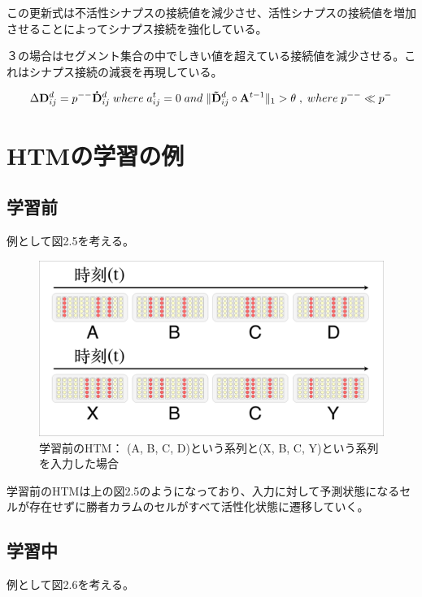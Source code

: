 この更新式は不活性シナプスの接続値を減少させ、活性シナプスの接続値を増加させることによってシナプス接続を強化している。

３の場合はセグメント集合の中でしきい値を超えている接続値を減少させる。これはシナプス接続の減衰を再現している。

\begin{equation}
  \Delta {\bf D}^d_{ij} = p^{--}{\bf \dot{D}}^d_{ij} \; where \; a^t_{ij} = 0 \; and \; \|{\bf \tilde{D}}^d_{ij} \circ {\bf A}^{t-1}\|_1 > \theta \; , \; where \; p^{--} \ll p^-
\end{equation}

\section{HTMの学習の例}

\subsection{学習前}
例として図2.5を考える。

\begin{figure}[ht]
  \begin{center}
    \includegraphics[width=14cm]{./fig/drawing_5}
    \caption{学習前のHTM： (A, B, C, D)という系列と(X, B, C, Y)という系列を入力した場合}
    \label{fig:HTM_before_learning}
  \end{center}
\end{figure}

学習前のHTMは上の図2.5のようになっており、入力に対して予測状態になるセルが存在せずに勝者カラムのセルがすべて活性化状態に遷移していく。

\newpage
\subsection{学習中}
例として図2.6を考える。

